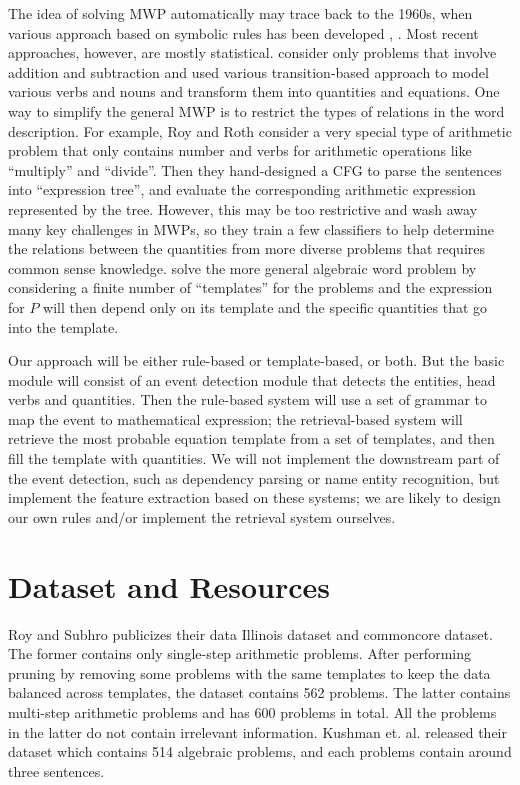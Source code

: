 \documentclass[11pt,a4paper]{article}
\begin{document}
The idea of solving MWP automatically may trace back to the 1960s, when various approach
 based on symbolic rules has been developed \citep{Bobrow:64}, \citep{Charniak:68}. Most recent approaches,
  however, are mostly statistical. \citep{Hosseini:14} consider only problems that involve addition and subtraction
  and used various transition-based approach to model various verbs and nouns and transform them into quantities
  and equations.  
One way to simplify the general MWP is to restrict the types of relations in the word description. 
For example, Roy and Roth \citep{Roy:15} \citep{Roy:16} 
 consider a very special type of arithmetic problem that only contains number and verbs for arithmetic operations like
 ``multiply'' and ``divide''. Then they hand-designed 
 a CFG to parse the sentences into ``expression tree'', and evaluate 
 the corresponding arithmetic expression represented by the tree. However, this may be too restrictive and wash away 
 many key challenges in MWPs, so they train a few classifiers to help determine the relations between the quantities 
 from more diverse problems that requires common sense knowledge.   
\citep{Kushman:14} solve the more general algebraic word problem by considering a finite number of ``templates'' for the problems and the expression for $P$ will then depend only on its template and the specific quantities that go into the template. 

Our approach will be either rule-based or template-based, or both. But the basic module will consist of an event detection module
that detects the entities, head verbs and quantities. Then the rule-based system will use a set of grammar to map the event to 
mathematical expression; the retrieval-based system will retrieve the most probable equation template from a set of templates, 
and then fill the template with quantities. We will not implement the downstream part of the event detection, such as dependency
parsing or name entity recognition, but implement the feature extraction based on these systems; we are likely to design our
own rules and/or implement the retrieval system ourselves. 

\section{Dataset and Resources}
Roy and Subhro \citep{Roy:16} publicizes their data Illinois dataset and commoncore dataset. The former
contains only single-step arithmetic problems. After performing pruning by removing some problems with the same templates
to keep the data balanced across templates, the dataset contains 562 problems. The latter contains multi-step 
arithmetic problems
 and has 600 problems in total. All the problems in the latter do not contain irrelevant information. Kushman et. al. 
 \citep{Kushman:14} released their dataset which contains 514 algebraic problems, and each problems contain 
 around three sentences.
 
\end{document}
